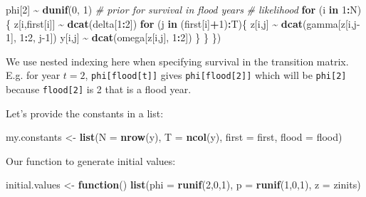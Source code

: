 \documentclass[
  12pt,
]{krantz}
\newenvironment{Shaded}{\begin{snugshade}}{\end{snugshade}}
\newcommand{\AttributeTok}[1]{\textcolor[rgb]{0.13,0.29,0.53}{#1}}
\newcommand{\CommentTok}[1]{\textcolor[rgb]{0.56,0.35,0.01}{\textit{#1}}}
\newcommand{\ControlFlowTok}[1]{\textcolor[rgb]{0.13,0.29,0.53}{\textbf{#1}}}
\newcommand{\DecValTok}[1]{\textcolor[rgb]{0.00,0.00,0.81}{#1}}
\newcommand{\FunctionTok}[1]{\textcolor[rgb]{0.13,0.29,0.53}{\textbf{#1}}}
\newcommand{\NormalTok}[1]{#1}
\newcommand{\OtherTok}[1]{\textcolor[rgb]{0.56,0.35,0.01}{#1}}
\newcommand{\SpecialCharTok}[1]{\textcolor[rgb]{0.81,0.36,0.00}{\textbf{#1}}}
\begin{document}
\begin{Shaded}
\begin{Highlighting}[]
\NormalTok{  phi[}\DecValTok{2}\NormalTok{] }\SpecialCharTok{\textasciitilde{}} \FunctionTok{dunif}\NormalTok{(}\DecValTok{0}\NormalTok{, }\DecValTok{1}\NormalTok{) }\CommentTok{\# prior for survival in flood years}
  \CommentTok{\# likelihood}
  \ControlFlowTok{for}\NormalTok{ (i }\ControlFlowTok{in} \DecValTok{1}\SpecialCharTok{:}\NormalTok{N)\{}
\NormalTok{    z[i,first[i]] }\SpecialCharTok{\textasciitilde{}} \FunctionTok{dcat}\NormalTok{(delta[}\DecValTok{1}\SpecialCharTok{:}\DecValTok{2}\NormalTok{])}
    \ControlFlowTok{for}\NormalTok{ (j }\ControlFlowTok{in}\NormalTok{ (first[i]}\SpecialCharTok{+}\DecValTok{1}\NormalTok{)}\SpecialCharTok{:}\NormalTok{T)\{}
\NormalTok{      z[i,j] }\SpecialCharTok{\textasciitilde{}} \FunctionTok{dcat}\NormalTok{(gamma[z[i,j}\DecValTok{{-}1}\NormalTok{], }\DecValTok{1}\SpecialCharTok{:}\DecValTok{2}\NormalTok{, j}\DecValTok{{-}1}\NormalTok{])}
\NormalTok{      y[i,j] }\SpecialCharTok{\textasciitilde{}} \FunctionTok{dcat}\NormalTok{(omega[z[i,j], }\DecValTok{1}\SpecialCharTok{:}\DecValTok{2}\NormalTok{])}
\NormalTok{    \}}
\NormalTok{  \}}
\NormalTok{\})}
\end{Highlighting}
\end{Shaded}

We use nested indexing here when specifying survival in the transition matrix. E.g. for year \(t = 2\), \texttt{phi{[}flood{[}t{]}{]}} gives \texttt{phi{[}flood{[}2{]}{]}} which will be \texttt{phi{[}2{]}} because \texttt{flood{[}2{]}} is 2 that is a flood year.

Let's provide the constants in a list:

\begin{Shaded}
\begin{Highlighting}[]
\NormalTok{my.constants }\OtherTok{\textless{}{-}} \FunctionTok{list}\NormalTok{(}\AttributeTok{N =} \FunctionTok{nrow}\NormalTok{(y),}
                     \AttributeTok{T =} \FunctionTok{ncol}\NormalTok{(y),}
                     \AttributeTok{first =}\NormalTok{ first,}
                     \AttributeTok{flood =}\NormalTok{ flood)}
\end{Highlighting}
\end{Shaded}

Our function to generate initial values:

\begin{Shaded}
\begin{Highlighting}[]
\NormalTok{initial.values }\OtherTok{\textless{}{-}} \ControlFlowTok{function}\NormalTok{() }\FunctionTok{list}\NormalTok{(}\AttributeTok{phi =} \FunctionTok{runif}\NormalTok{(}\DecValTok{2}\NormalTok{,}\DecValTok{0}\NormalTok{,}\DecValTok{1}\NormalTok{),}
                                  \AttributeTok{p =} \FunctionTok{runif}\NormalTok{(}\DecValTok{1}\NormalTok{,}\DecValTok{0}\NormalTok{,}\DecValTok{1}\NormalTok{),}
                                  \AttributeTok{z =}\NormalTok{ zinits)}
\end{Highlighting}
\end{Shaded}
\end{document}
